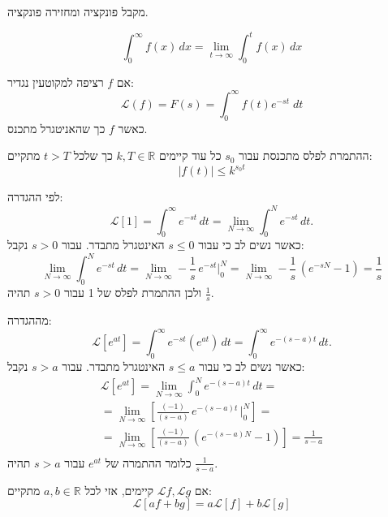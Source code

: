 \documentclass{tstextbook}
\begin{document}
\begin{definition}[התמרה]
מקבל פונקציה ומחזירה פונקציה.

\end{definition}
\begin{reminder}
$$\int_{0}^{\infty} f(x) \, dx =\lim_{ t \to \infty } \int_{0}^{t} f(x) \, dx $$

\end{reminder}
\begin{definition}
אם \(f\) רציפה למקוטעין נגדיר:$$\mathcal{L}(f)=F(s)=\int_0^\infty f(t)e^{-st} \; dt$$
כאשר \(f\) כך שהאניטגרל מתכנס.

\end{definition}
\begin{proposition}
ההתמרת לפלס מתכנסת עבור \(s_{0}\) כל עוד קיימים \(k,T \in \mathbb{R}\) כך שלכל \(t>T\) מתקיים:
$$\lvert f(t) \rvert \leq k ^{s_{0}t}$$

\end{proposition}
\begin{example}
לפי ההגדרה:
$${\mathcal{L}}[1]=\int_{0}^{\infty}e^{-s t}\,d t=\operatorname*{lim}_{N\to\infty}\int_{0}^{N}e^{-s t}\,d t.$$
כאשר נשים לב כי עבור \(s\leq 0\) האינטגרל מתבדר. עבור \(s>0\) נקבל:
$$\operatorname*{lim}_{N\to\infty}\int_{0}^{N}e^{-s t}\,d t=\operatorname*{lim}_{N\to\infty}-{\frac{1}{s}}\,e^{-s t}{\Big|}_{0}^{N}=\operatorname*{lim}_{N\to\infty}-{\frac{1}{s}}\,(e^{-s N}-1)=\frac{1}{s}$$
ולכן ההתמרת לפלס של 1 עבור \(s>0\) תהיה \(\frac{1}{s}\).

\end{example}
\begin{example}
מההגדרה:
$${\mathcal{L}}[e^{a t}]=\int_{0}^{\infty}e^{-s t}(e^{a t})\,d t=\int_{0}^{\infty}e^{-(s-a)t}\,d t.$$
כאשר נשים לב כי עבור \(s\leq a\) האינטגרל מתבדר. עבור \(s>a\) נקבל:
\begin{gather*}{\mathcal{L}}[e^{a t}]=\operatorname*{lim}_{N\to\infty}\int_{0}^{N}e^{-(s-a)t}\,d t=\\{{=\operatorname*{lim}_{N\to\infty}\left[\frac{(-1)}{(s-a)}\,e^{-(s-a)t}\,{\bigg|}_{0}^{N}\right]}}=\\ {{=\operatorname*{lim}_{N\to\infty}\left[\frac{(-1)}{(s-a)}\,(e^{-(s-a)N}-1)\right]}}= \frac{1}{s-a}\\\end{gather*}
כלומר ההתמרה של \(e^{at}\) עבור \(s> a\) תהיה \(\frac{1}{s-a}\).

\end{example}
\begin{proposition}[לינאריות]
אם \(\mathcal{L}f,\mathcal{L}g\) קיימים, אזי לכל \(a,b \in \mathbb{R}\) מתקיים:
$${\mathcal{L}}[a f+b g]=a{\mathcal{L}}[f]+b{\mathcal{L}}[g]$$

\end{proposition}
\end{document}
